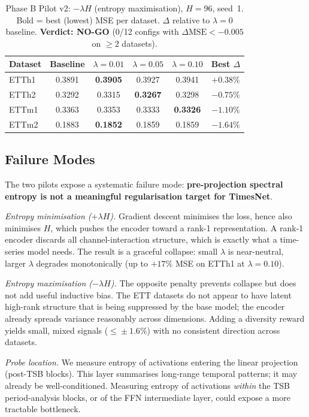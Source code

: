 \documentclass[10pt]{article}
\begin{document}
\begin{table}[h]
\centering\small
\caption{Phase B Pilot v2: $-\lambda H$ (entropy maximisation), $H=96$, seed~1.
Bold = best (lowest) MSE per dataset. $\Delta$ relative to $\lambda=0$ baseline.
\textbf{Verdict: NO-GO} (0/12 configs with $\Delta\text{MSE} < -0.005$ on
$\geq\!2$ datasets).}
\label{tab:phase_b_v2}
\begin{tabular}{l c c c c c}
\toprule
Dataset & Baseline & $\lambda{=}0.01$ & $\lambda{=}0.05$ & $\lambda{=}0.10$ & Best $\Delta$ \\
\midrule
ETTh1 & 0.3891 & \textbf{0.3905} & 0.3927 & 0.3941 & $+0.38\%$ \\
ETTh2 & 0.3292 & 0.3315 & \textbf{0.3267} & 0.3298 & $-0.75\%$ \\
ETTm1 & 0.3363 & 0.3353 & 0.3333 & \textbf{0.3326} & $-1.10\%$ \\
ETTm2 & 0.1883 & \textbf{0.1852} & 0.1859 & 0.1859 & $-1.64\%$ \\
\bottomrule
\end{tabular}
\end{table}

\subsection{Failure Modes}
\label{sec:failure_modes}

The two pilots expose a systematic failure mode:
\textbf{pre-projection spectral entropy is not a meaningful regularisation
target for TimesNet}.

\emph{Entropy minimisation ($+\lambda H$).}
Gradient descent minimises the loss, hence also minimises $H$, which pushes
the encoder toward a rank-1 representation. A rank-1 encoder discards all
channel-interaction structure, which is exactly what a time-series model needs.
The result is a graceful collapse: small $\lambda$ is near-neutral, larger
$\lambda$ degrades monotonically (up to $+17\%$ MSE on ETTh1 at $\lambda=0.10$).

\emph{Entropy maximisation ($-\lambda H$).}
The opposite penalty prevents collapse but does not add useful inductive bias.
The ETT datasets do not appear to have latent high-rank structure that is
being suppressed by the base model; the encoder already spreads variance
reasonably across dimensions. Adding a diversity reward yields small, mixed
signals ($\leq\!\pm1.6\%$) with no consistent direction across datasets.

\emph{Probe location.}
We measure entropy of activations entering the linear projection (post-TSB
blocks). This layer summarises long-range temporal patterns; it may already be
well-conditioned. Measuring entropy of activations \emph{within} the TSB
period-analysis blocks, or of the FFN intermediate layer, could expose a more
tractable bottleneck.
\end{document}
